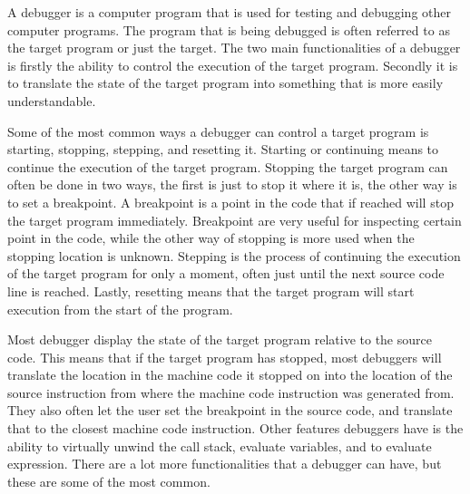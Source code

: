  


A debugger is a computer program that is used for testing and debugging other computer programs.
The program that is being debugged is often referred to as the target program or just the target.
The two main functionalities of a debugger is firstly the ability to control the execution of the target program.
Secondly it is to translate the state of the target program into something that is more easily understandable.


Some of the most common ways a debugger can control a target program is starting, stopping, stepping, and resetting it.
Starting or continuing means to continue the execution of the target program.
Stopping the target program can often be done in two ways, the first is just to stop it where it is, the other way is to set a breakpoint.
A breakpoint is a point in the code that if reached will stop the target program immediately.
Breakpoint are very useful for inspecting certain point in the code, while the other way of stopping is more used when the stopping location is unknown.
Stepping is the process of continuing the execution of the target program for only a moment, often just until the next source code line is reached.
Lastly, resetting means that the target program will start execution from the start of the program.


Most debugger display the state of the target program relative to the source code.
This means that if the target program has stopped, most debuggers will translate the location in the machine code it stopped on into the location of the source instruction from where the machine code instruction was generated from.
They also often let the user set the breakpoint in the source code, and translate that to the closest machine code instruction.
Other features debuggers have is the ability to virtually unwind the call stack, evaluate variables, and to evaluate expression.
There are a lot more functionalities that a debugger can have, but these are some of the most common.

